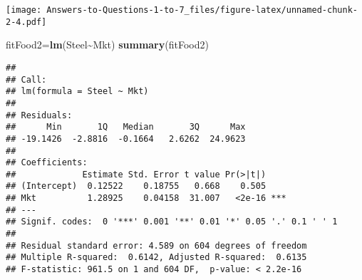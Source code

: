 \documentclass[
]{article}
\newenvironment{Shaded}{\begin{snugshade}}{\end{snugshade}}
\newcommand{\CommentTok}[1]{\textcolor[rgb]{0.56,0.35,0.01}{\textit{#1}}}
\newcommand{\DecValTok}[1]{\textcolor[rgb]{0.00,0.00,0.81}{#1}}
\newcommand{\FunctionTok}[1]{\textcolor[rgb]{0.13,0.29,0.53}{\textbf{#1}}}
\newcommand{\NormalTok}[1]{#1}
\newcommand{\OtherTok}[1]{\textcolor[rgb]{0.56,0.35,0.01}{#1}}
\newcommand{\SpecialCharTok}[1]{\textcolor[rgb]{0.81,0.36,0.00}{\textbf{#1}}}
\begin{document}
\begin{Shaded}
\end{Shaded}

\texttt{[image: Answers-to-Questions-1-to-7\_files/figure-latex/unnamed-chunk-2-4.pdf]}

\begin{Shaded}
\begin{Highlighting}[]
\NormalTok{fitFood2}\OtherTok{=}\FunctionTok{lm}\NormalTok{(Steel}\SpecialCharTok{\textasciitilde{}}\NormalTok{Mkt)}
\FunctionTok{summary}\NormalTok{(fitFood2)}
\end{Highlighting}
\end{Shaded}

\begin{verbatim}
## 
## Call:
## lm(formula = Steel ~ Mkt)
## 
## Residuals:
##      Min       1Q   Median       3Q      Max 
## -19.1426  -2.8816  -0.1664   2.6262  24.9623 
## 
## Coefficients:
##             Estimate Std. Error t value Pr(>|t|)    
## (Intercept)  0.12522    0.18755   0.668    0.505    
## Mkt          1.28925    0.04158  31.007   <2e-16 ***
## ---
## Signif. codes:  0 '***' 0.001 '**' 0.01 '*' 0.05 '.' 0.1 ' ' 1
## 
## Residual standard error: 4.589 on 604 degrees of freedom
## Multiple R-squared:  0.6142, Adjusted R-squared:  0.6135 
## F-statistic: 961.5 on 1 and 604 DF,  p-value: < 2.2e-16
\end{verbatim}

\begin{Shaded}
\end{Shaded}
\end{document}
